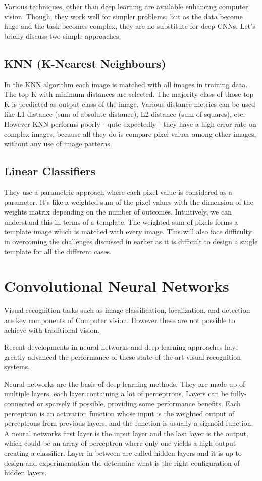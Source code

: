 Various techniques, other than deep learning are available enhancing computer
vision. Though, they work well for simpler problems, but as the data become huge
and the task becomes complex, they are no substitute for deep CNNs. Let’s
briefly discuss two simple approaches.

\subsection{KNN (K-Nearest Neighbours)}

In the KNN algorithm each image is matched with all images in training data. The
top K with minimum distances are selected. The majority class of those top K is
predicted as output class of the image. Various distance metrics can be used
like L1 distance (sum of absolute distance), L2 distance (sum of squares), etc.
However KNN performs poorly - qute expectedly - they have a high error rate on
complex images, because all they do is compare pixel values among other images,
without any use of image patterns.

\subsection{Linear Classifiers}

They use a parametric approach where each pixel value is considered as a
parameter. It’s like a weighted sum of the pixel values with the dimension of
the weights matrix depending on the number of outcomes. Intuitively, we can
understand this in terms of a template. The weighted sum of pixels forms a
template image which is matched with every image. This will also face difficulty
in overcoming the challenges discussed in earlier as it is difficult to design a
single template for all the different cases.

\section{Convolutional Neural Networks}

Visual recognition tasks such as image classification, localization, and
detection are key components of Computer vision. However these are not possible
to achieve with traditional vision.

Recent developments in neural networks and deep learning approaches have greatly
advanced the performance of these state-of-the-art visual recognition systems.

Neural networks are the basis of deep learning methods. They are made up of
multiple layers, each layer containing a lot of perceptrons. Layers can be
fully-connected or sparsely if possible, providing some performance benefits.
Each perceptron is an activation function whose input is the weighted output of
perceptrons from previous layers, and the function is usually a sigmoid
function. A neural networks first layer is the input layer and the last layer is
the output, which could be an array of perceptron where only one yields a high
output creating a classifier. Layer in-between are called hidden layers and it
is up to design and experimentation the determine what is the right
configuration of hidden layers.

